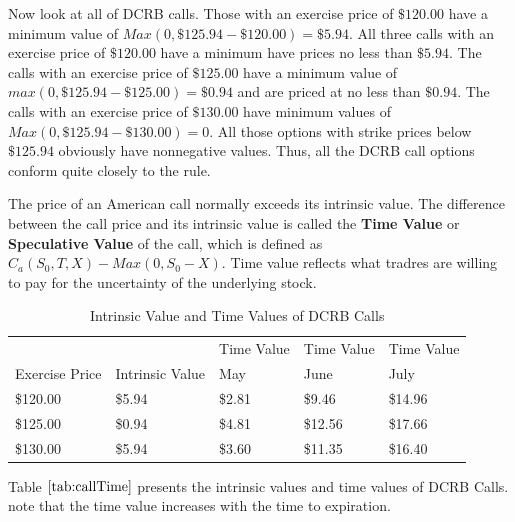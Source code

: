 \documentclass{book}
\theoremstyle{definition}
\theoremstyle{remark}
\begin{document}
            
            Now look at all of DCRB calls. Those with an exercise price of $\$120.00$ have a minimum value of $Max(0, \$125.94 - \$120.00) = \$5.94 $. All three calls with an exercise price of $\$120.00$ have a minimum have prices no less than $\$5.94$. The calls with an exercise price of $\$125.00$ have a minimum value of $max(0, \$125.94 -\$125.00) = \$0.94$ and are priced at no less than $\$0.94$. The calls with an exercise price of $\$130.00$ have minimum values of $Max(0, \$125.94 - \$130.00) = 0$. All those options with strike prices below $\$125.94$ obviously have nonnegative values. Thus, all the DCRB call options conform quite closely to the rule. 
            
            The price of an American call normally exceeds its intrinsic value. The difference between the call price and its intrinsic value is called the \textbf{Time Value} or \textbf{Speculative Value} of the call, which is defined as $C_a(S_0, T, X) - Max(0, S_0 -X)$. Time value reflects what tradres are willing to pay for the uncertainty of the underlying stock.
            
                \begin{table}[h]
                    \centering
                    \caption{Intrinsic Value and Time Values of DCRB Calls}
                    \label{tab:callTime}
                    \begin{tabular}[h]{lllll}
                    \toprule
                        & & Time Value & Time Value & Time Value \\
                        Exercise Price & Intrinsic Value & May & June & July \\
                    \midrule
                        \$120.00 & \$5.94 & \$2.81 & \$9.46 & \$14.96 \\
                        \$125.00 & \$0.94 & \$4.81 & \$12.56 & \$17.66 \\
                        \$130.00 & \$5.94 & \$3.60 & \$11.35 & \$16.40 \\
                    \bottomrule
                    \end{tabular}
                \end{table}
            Table $\ref{tab:callTime}$ presents the intrinsic values and time values of DCRB Calls. note that the time value increases with the time to expiration.
            
\end{document}
